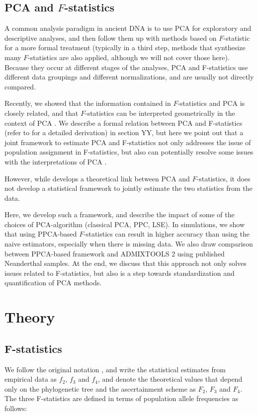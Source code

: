 \documentclass[12pt, letterpaper]{article}
\begin{document}
\subsection{PCA and $F$-statistics}

A common analysis paradigm in ancient DNA is to use PCA for exploratory and descriptive analyses, and then follow them up with methods based on $F$-statistic for a more formal treatment (typically in a third step, methods that synthesize many $F$-statistics are also applied, although we will not cover those here). Because they occur at different stages of the analyses, PCA and F-statistics use different data groupings and different normalizations, and are usually not directly compared. 

Recently, we showed that the information contained in $F$-statistics and PCA is closely related, and that $F$-statistics can be interpreted geometrically in the context of PCA \cite{peter_geometric_2022}. We describe a formal relation between PCA and F-statistics (refer to \cite{peter_geometric_2022} for a detailed derivation) in section YY, but here we point out that a joint framework to estimate PCA and F-statistics not only addresses the issue of population assignment in F-statistics, but also can potentially resolve some issues with the interpretations of PCA \cite{novembre_genes_2008, noauthor_cavalli-sforza_nodate, degiorgio_geographic_2013, francois_principal_2010}. 

However, while \cite{peter_geometric_2022} develops a theoretical link between PCA and $F$-statistics, it does not develop a statistical framework to jointly estimate the two statistics from the data. 

Here, we develop such a framework, and describe the impact of some of the choices of PCA-algorithm (classical PCA, PPC, LSE). In simulations, we show that using PPCA-based $F$-statistics can result in higher accuracy than using the naive estimators, especially when there is missing data. We also draw comparison between PPCA-based framework and ADMIXTOOLS 2 using published Neanderthal samples. At the end, we discuss that this approach not only solves issues related to F-statistics, but also is a step towards standardization and quantification of PCA methods.

\section{Theory}

\subsection{F-statistics}
We follow the original notation \cite{patterson_ancient_2012}, and write the statistical estimates from empirical data as $f_2$, $f_3$ and $f_4$, and denote the theoretical values that depend only on the phylogenetic tree and the ascertainment scheme as $F_2$, $F_3$ and $F_4$. The three F-statistics are defined in terms of population allele frequencies as follows:
\end{document}
